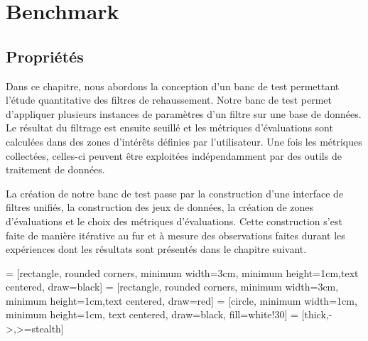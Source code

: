 %

\chapter{Benchmark}
\label{sec:Benchmark}


\section{Propriétés}
\label{sec:Benchmark}

Dans ce chapitre, nous abordons la conception d'un banc de test permettant l'étude quantitative des filtres de rehaussement. Notre banc de test permet d'appliquer plusieurs instances de paramètres d'un filtre sur une base de données. Le résultat du filtrage est ensuite seuillé et les métriques d'évaluations sont calculées dans des zones d'intérêts définies par l'utilisateur. Une fois les métriques collectées, celles-ci peuvent être exploitées indépendamment par des outils de traitement de données. 

La création de notre banc de test passe par la construction d'une interface de filtres unifiés, la construction des jeux de données, la création de zones d'évaluations et le choix des métriques d'évaluations. Cette construction s'est faite de manière itérative au fur et à mesure des observations faites durant les expériences dont les résultats sont présentés dans le chapitre suivant.

 = [rectangle, rounded corners, minimum width=3cm, minimum height=1cm,text centered, draw=black]
 = [rectangle, rounded corners, minimum width=3cm, minimum height=1cm,text centered, draw=red]
 = [circle, minimum width=1cm, minimum height=1cm, text centered, draw=black, fill=white!30]
 = [thick,->,>=stealth]

